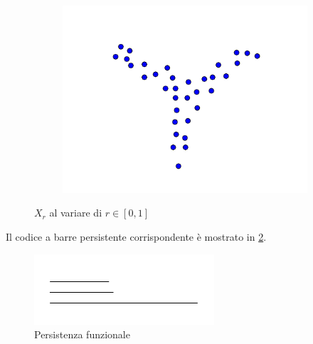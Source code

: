 \begin{figure}[ht]
\begin{center}
\begin{subfigure}[b]{.3\textwidth}
      \includegraphics[width=\textwidth]{gfx/functional_all.pdf}
    \end{subfigure}
    \caption{$X_r$ al variare di $r\in [0,1]$}  \label{fig:threeflarescomparison}
  \end{center}
\end{figure}

Il codice a barre persistente corrispondente è mostrato in \cref{fig:threeflarepersistence}.

\begin{figure}[ht]
  \includegraphics[width=.7\linewidth]{gfx/barcode_flares.pdf}
  \caption{Persistenza funzionale}
  \label{fig:threeflarepersistence}
\end{figure}

